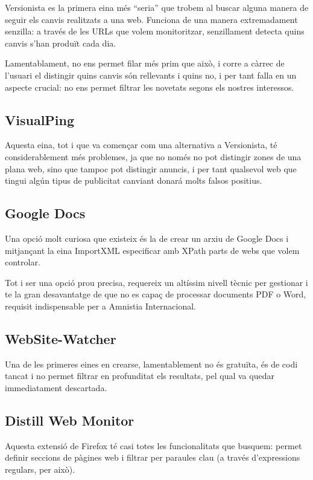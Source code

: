 \documentclass{article}
\begin{document}
Versionista es la primera eina més ``seria'' que trobem al buscar alguna manera de seguir els canvis realitzats a una web. Funciona de una manera extremadament senzilla: a través de les URLs que volem monitoritzar, senzillament detecta quins canvis s'han produït cada dia.

Lamentablament, no ens permet filar més prim que això, i corre a càrrec de l'usuari el distingir quins canvis són rellevants i quins no, i per tant falla en un aspecte crucial: no ens permet filtrar les novetats segons els nostres interessos.


\subsection{VisualPing}

Aquesta eina, tot i que va començar com una alternativa a Versionista, té considerablement més problemes, ja que no només no pot distingir zones de una plana web, sino que tampoc pot distingir anuncis, i per tant qualsevol web que tingui algún tipus de publicitat canviant donará molts falsos positius.

\subsection{Google Docs}

Una opció molt curiosa que existeix és la de crear un arxiu de Google Docs i mitjançant la eina ImportXML especificar amb XPath parts de webs que volem controlar.

Tot i ser una opció prou precisa, requereix un altíssim nivell tècnic per gestionar i te la gran desavantatge de que no es capaç de processar documents PDF o Word, requisit indispensable per a Amnistia Internacional.

\subsection{WebSite-Watcher}

Una de les primeres eines en crearse, lamentablement no és gratuïta, és de codi tancat i no permet filtrar en profunditat els resultats, pel qual va quedar immediatament descartada.

\subsection{Distill Web Monitor}

Aquesta extensió de Firefox té casi totes les funcionalitats que busquem: permet definir seccions de pàgines web i filtrar per paraules clau (a través d'expressions regulars, per això).
\end{document}
